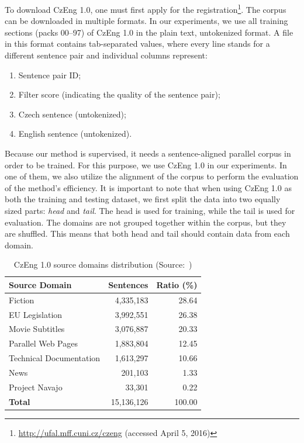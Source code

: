 To download CzEng 1.0, one must first apply for the registration\footnote{\url{http://ufal.mff.cuni.cz/czeng} (accessed April 5, 2016)}. The corpus can be downloaded in multiple formats. In our experiments, we use all training sections (packs 00--97) of CzEng 1.0 in the plain text, untokenized format. A file in this format contains tab-separated values, where every line stands for a different sentence pair and individual columns represent:

\begin{enumerate}[itemsep=0pt]
	\item Sentence pair ID;
	\item Filter score (indicating the quality of the sentence pair);
	\item Czech sentence (untokenized);
	\item English sentence (untokenized).
\end{enumerate}

Because our method is supervised, it needs a sentence-aligned parallel corpus in order to be trained. For this purpose, we use CzEng 1.0 in our experiments. In one of them, we also utilize the alignment of the corpus to perform the evaluation of the method's efficiency. It is important to note that when using CzEng 1.0 as both the training and testing dataset, we first split the data into two equally sized parts: \textit{head} and \textit{tail}. The head is used for training, while the tail is used for evaluation. The domains are not grouped together within the corpus, but they are shuffled. This means that both head and tail should contain data from each domain.

\begin{table}[!htb]
	\centering
	\caption{CzEng 1.0 source domains distribution (Source:~\cite{Bojar12_2})}
	\label{table:czeng}
	\vspace{1em}
	\begin{tabular}{|l|r|r|}
		\hline
		\textbf{Source Domain} & \textbf{Sentences} & \textbf{Ratio (\%)} \\
		\hline
		Fiction & 4,335,183 & 28.64 \\
		EU Legislation & 3,992,551 & 26.38 \\
		Movie Subtitles & 3,076,887 & 20.33 \\
		Parallel Web Pages & 1,883,804 & 12.45 \\
		Technical Documentation & 1,613,297 & 10.66 \\
		News & 201,103 & 1.33 \\
		Project Navajo & 33,301 & 0.22 \\
		\hline
		\textbf{Total} & 15,136,126 & 100.00 \\
		\hline
	\end{tabular}
\end{table}

